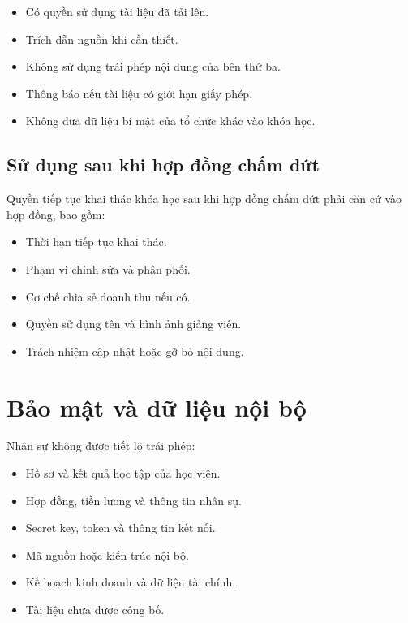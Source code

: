 \documentclass[12pt,a4paper]{article}
\begin{document}
\begin{itemize}
    \item Có quyền sử dụng tài liệu đã tải lên.
    \item Trích dẫn nguồn khi cần thiết.
    \item Không sử dụng trái phép nội dung của bên thứ ba.
    \item Thông báo nếu tài liệu có giới hạn giấy phép.
    \item Không đưa dữ liệu bí mật của tổ chức khác vào khóa học.
\end{itemize}

\subsection{Sử dụng sau khi hợp đồng chấm dứt}

Quyền tiếp tục khai thác khóa học sau khi hợp đồng chấm dứt
phải căn cứ vào hợp đồng, bao gồm:

\begin{itemize}
    \item Thời hạn tiếp tục khai thác.
    \item Phạm vi chỉnh sửa và phân phối.
    \item Cơ chế chia sẻ doanh thu nếu có.
    \item Quyền sử dụng tên và hình ảnh giảng viên.
    \item Trách nhiệm cập nhật hoặc gỡ bỏ nội dung.
\end{itemize}

\section{Bảo mật và dữ liệu nội bộ}

Nhân sự không được tiết lộ trái phép:

\begin{itemize}
    \item Hồ sơ và kết quả học tập của học viên.
    \item Hợp đồng, tiền lương và thông tin nhân sự.
    \item Secret key, token và thông tin kết nối.
    \item Mã nguồn hoặc kiến trúc nội bộ.
    \item Kế hoạch kinh doanh và dữ liệu tài chính.
    \item Tài liệu chưa được công bố.
\end{itemize}
\end{document}
